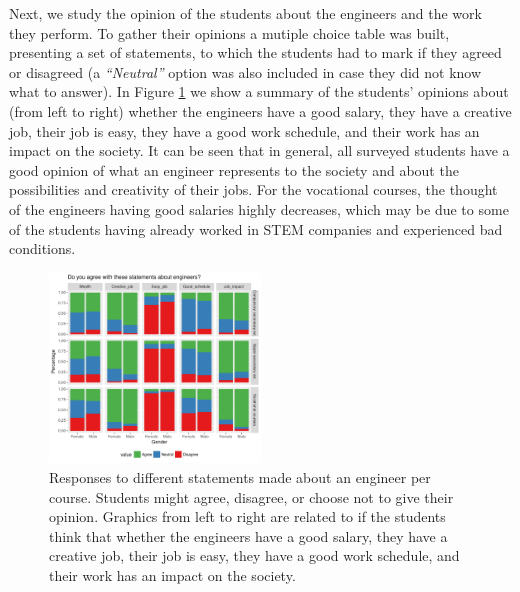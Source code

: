 \documentclass[journal,transmag]{IEEEtran}
\begin{document}
%

Next, we study the opinion of the students about the engineers and the work they perform. To gather their opinions a mutiple choice table was built, presenting a set of statements, to which the students had to mark if they agreed or disagreed (a \textit{``Neutral''} option was also included in case they did not know what to answer). In Figure \ref{fig:opinions} we show a summary of the students' opinions about (from left to right) whether the engineers have a good salary, they have a creative job, their job is easy, they have a good work schedule, and their work has an impact on the society. It can be seen that in general, all surveyed students have a good opinion of what an engineer represents to the society and about the possibilities and creativity of their jobs. For the vocational courses, the thought of the engineers having good salaries highly decreases, which may be due to some of the students having already worked in STEM companies and experienced bad conditions. 

\begin{figure}
  \centering
  \includegraphics[width=0.5\textwidth]{img/engineer_opinions.pdf}
  \caption{Responses to different statements made about an engineer per course. Students might agree, disagree, or choose not to give their opinion. Graphics from left to right are related to if the students think that whether the engineers have a good salary, they have a creative job, their job is easy, they have a good work schedule, and their work has an impact on the society.}
  \label{fig:opinions}
\end{figure}
\end{document}
